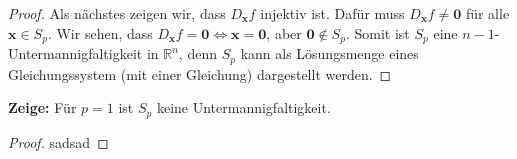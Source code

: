 \documentclass[a4paper, landscape,twocolumn,fontsize=9pt]{scrartcl}
\renewcommand{\hline}{\noindent\makebox[\linewidth]{\rule{12cm}{1pt}}}
\begin{document}
\begin{proof}
\hline

Als nächstes zeigen wir, dass $D_\mathbf{x}f$ injektiv ist. Dafür muss $D_\mathbf{x}f \neq \mathbf 0$ für alle $\mathbf x \in S_p$. Wir sehen, dass $D_\mathbf{x} f = \mathbf 0 \iff \mathbf x = \mathbf 0$, aber $\mathbf 0 \notin S_p$. Somit ist $S_p$ eine $n-1$-Untermannigfaltigkeit in $\mathbb R^n$, denn $S_p$ kann als Lösungsmenge eines Gleichungssystem (mit einer Gleichung) dargestellt werden.
\end{proof}

\hline

\textbf{Zeige:} Für $p = 1$ ist $S_p$ keine Untermannigfaltigkeit.

\begin{proof}
sadsad
\end{proof}
\end{document}

